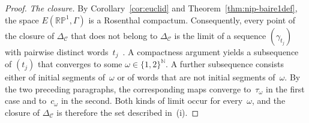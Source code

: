 \documentclass[psamsfonts]{amsart}
\theoremstyle{definition}
\theoremstyle{remark}
\newcommand{\RP}{\mathbb{R}\mathbb{P}}
\numberwithin{equation}{section}
\begin{document}
\begin{proof}
\emph{The closure.}
By Corollary~\ref{cor:euclid} and Theorem~\ref{thm:nip-baire1def}, the space $E(\RP^1,\Gamma)$ is a Rosenthal compactum.
Consequently, every point of the closure of $\Delta_{\mathcal{C}}$ that does not belong to $\Delta_{\mathcal{C}}$ is the limit of a sequence $(\gamma_{t_j})$ with pairwise distinct words~$t_j$~\cite[Theorem~3F]{BFT_1978_PCompactBaire}.
A compactness argument yields a subsequence of $(t_j)$ that converges to some $\omega\in\{1,2\}^{\mathbb{N}}$.
A further subsequence consists either of initial segments of~$\omega$ or of words that are not initial segments of~$\omega$.
By the two preceding paragraphs, the corresponding maps converge to~$\tau_\omega$ in the first case and to~$c_\omega$ in the second.
Both kinds of limit occur for every~$\omega$, and the closure of $\Delta_{\mathcal{C}}$ is therefore the set described in~(i).


\end{proof}
\end{document}
